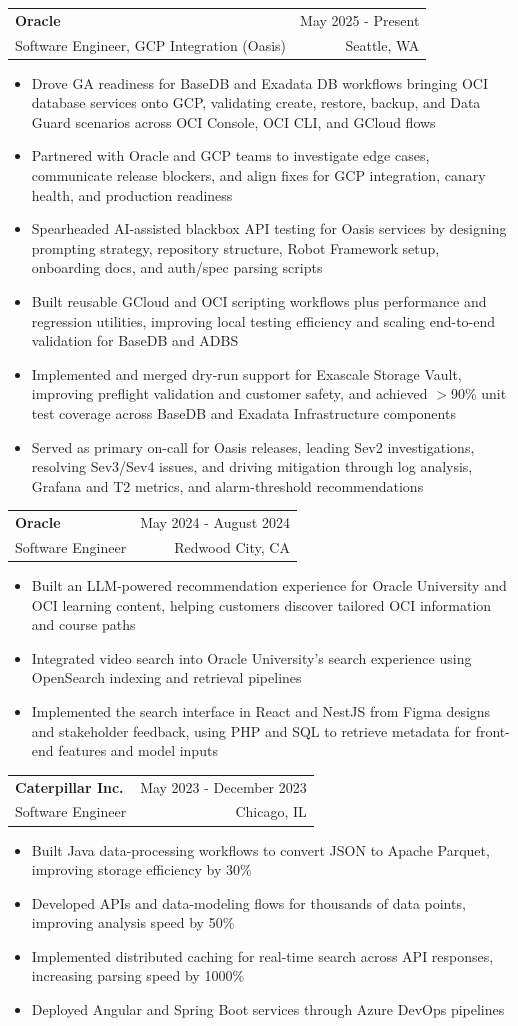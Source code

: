 \documentclass[letterpaper,11pt]{article}
\makeatletter
\newcommand{\resumeItem}[1]{
  \item\small{
    {#1 \vspace{-2pt}}
  }
}
\newcommand{\resumeSubheading}[4]{
  \vspace{-2pt}\item
    \begin{tabular*}{0.97\textwidth}[t]{l@{\extracolsep{\fill}}r}
      \textbf{#1} & #2 \\
      {\small#3} & {\small #4} \\
    \end{tabular*}\vspace{-7pt}
}
\newcommand{\resumeItemListStart}{\begin{itemize}}
\newcommand{\resumeItemListEnd}{\end{itemize}\vspace{-5pt}}
\makeatother
\begin{document}
    \resumeSubheading
  {Oracle}{May 2025 - Present}
  {Software Engineer, GCP Integration (Oasis)}{Seattle, WA}
  \resumeItemListStart
    \resumeItem{Drove GA readiness for BaseDB and Exadata DB workflows bringing OCI database services onto GCP, validating create, restore, backup, and Data Guard scenarios across OCI Console, OCI CLI, and GCloud flows}
    \resumeItem{Partnered with Oracle and GCP teams to investigate edge cases, communicate release blockers, and align fixes for GCP integration, canary health, and production readiness}
    \resumeItem{Spearheaded AI-assisted blackbox API testing for Oasis services by designing prompting strategy, repository structure, Robot Framework setup, onboarding docs, and auth/spec parsing scripts}
    \resumeItem{Built reusable GCloud and OCI scripting workflows plus performance and regression utilities, improving local testing efficiency and scaling end-to-end validation for BaseDB and ADBS}
    \resumeItem{Implemented and merged dry-run support for Exascale Storage Vault, improving preflight validation and customer safety, and achieved $>$90\% unit test coverage across BaseDB and Exadata Infrastructure components}
    \resumeItem{Served as primary on-call for Oasis releases, leading Sev2 investigations, resolving Sev3/Sev4 issues, and driving mitigation through log analysis, Grafana and T2 metrics, and alarm-threshold recommendations}
  \resumeItemListEnd

    \resumeSubheading
      {Oracle}{May 2024 - August 2024}
      {Software Engineer}{Redwood City, CA}
      \resumeItemListStart
        \resumeItem{Built an LLM-powered recommendation experience for Oracle University and OCI learning content, helping customers discover tailored OCI information and course paths}
        \resumeItem{Integrated video search into Oracle University's search experience using OpenSearch indexing and retrieval pipelines}
        \resumeItem{Implemented the search interface in React and NestJS from Figma designs and stakeholder feedback, using PHP and SQL to retrieve metadata for front-end features and model inputs}
      \resumeItemListEnd

    \resumeSubheading
      {Caterpillar Inc.}{May 2023 - December 2023}
      {Software Engineer}{Chicago, IL}
      \resumeItemListStart
        \resumeItem{Built Java data-processing workflows to convert JSON to Apache Parquet, improving storage efficiency by 30\%}
        \resumeItem{Developed APIs and data-modeling flows for thousands of data points, improving analysis speed by 50\%}
        \resumeItem{Implemented distributed caching for real-time search across API responses, increasing parsing speed by 1000\%}
        \resumeItem{Deployed Angular and Spring Boot services through Azure DevOps pipelines}
      \resumeItemListEnd
\end{document}

